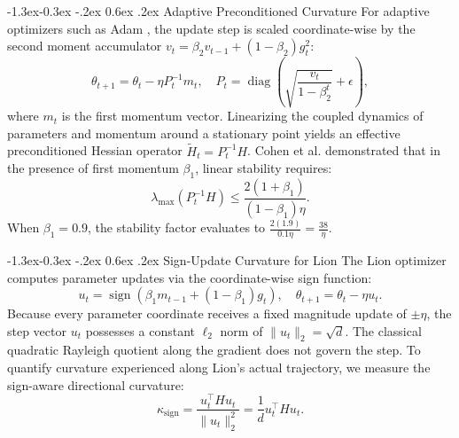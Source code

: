 \documentclass[10pt,twocolumn]{article}
\makeatletter
\renewcommand\subsection{\@startsection{subsection}{2}{\z@}%
                                     {-1.3ex\@plus -0.3ex \@minus -.2ex}%
                                     {0.6ex \@plus .2ex}%
                                     {\normalfont\normalsize\bfseries}}
\makeatother
\begin{document}
\subsection{Adaptive Preconditioned Curvature}
For adaptive optimizers such as Adam \cite{kingma2015adam}, the update step is scaled coordinate-wise by the second moment accumulator $v_t = \beta_2 v_{t-1} + (1 - \beta_2) g_t^2$:
\begin{equation}
\theta_{t+1} = \theta_t - \eta P_t^{-1} m_t, \quad P_t = \operatorname{diag}\left(\sqrt{\frac{v_t}{1 - \beta_2^t}} + \epsilon\right),
\end{equation}
where $m_t$ is the first momentum vector. Linearizing the coupled dynamics of parameters and momentum around a stationary point yields an effective preconditioned Hessian operator $\widetilde{H}_t = P_t^{-1} H$. Cohen et al. \cite{cohen2022adaptive} demonstrated that in the presence of first momentum $\beta_1$, linear stability requires:
\begin{equation}
\lambda_{\max}(P_t^{-1} H) \le \frac{2(1 + \beta_1)}{(1 - \beta_1)\eta}.
\label{eq:adam_thresh}
\end{equation}
When $\beta_1 = 0.9$, the stability factor evaluates to $\frac{2(1.9)}{0.1 \eta} = \frac{38}{\eta}$.

\subsection{Sign-Update Curvature for Lion}
The Lion optimizer \cite{chen2023symbolic} computes parameter updates via the coordinate-wise sign function:
\begin{equation}
u_t = \operatorname{sign}(\beta_1 m_{t-1} + (1 - \beta_1) g_t), \quad \theta_{t+1} = \theta_t - \eta u_t.
\end{equation}
Because every parameter coordinate receives a fixed magnitude update of $\pm \eta$, the step vector $u_t$ possesses a constant $\ell_2$ norm of $\|u_t\|_2 = \sqrt{d}$. The classical quadratic Rayleigh quotient along the gradient does not govern the step. To quantify curvature experienced along Lion's actual trajectory, we measure the sign-aware directional curvature:
\begin{equation}
\kappa_{\text{sign}} = \frac{u_t^\top H u_t}{\|u_t\|_2^2} = \frac{1}{d} u_t^\top H u_t.
\end{equation}
\end{document}
